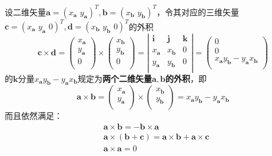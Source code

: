 \begin{definition}[二维矢量外积]
设二维矢量$\boldsymbol{a}=\left( x_{\boldsymbol{a}}\,\,y_{\boldsymbol{a}} \right) ^T,\boldsymbol{b}=\left( x_{\boldsymbol{b}}\,\,y_{\boldsymbol{b}}  \right) ^T$，令其对应的三维矢量$\boldsymbol{c}=\left( x_{\boldsymbol{a}}\,\,y_{\boldsymbol{a}}\,\,0  \right) ^T,\boldsymbol{d}=\left( x_{\boldsymbol{b}}\,\,y_{\boldsymbol{b}}\,\,0 \right) ^T$的外积
\[
\boldsymbol{c}\times \boldsymbol{d}=\left( \begin{array}{c}
	x_{\boldsymbol{a}}\\
	y_{\boldsymbol{a}}\\
	0\\
\end{array} \right) \times \left( \begin{array}{c}
	x_{\boldsymbol{b}}\\
	y_{\boldsymbol{b}}\\
	0\\
\end{array} \right) =\left| \begin{matrix}
	\mathbf{i}&		\mathbf{j}&		\mathbf{k}\\
	x_{\boldsymbol{a}}&		x_{\boldsymbol{b}}&		0\\
	y_{\boldsymbol{a}}&		y_{\boldsymbol{b}}&		0\\
\end{matrix} \right|=\left( \begin{array}{c}
	0\\
	0\\
	x_{\boldsymbol{a}}y_{\boldsymbol{b}}-y_{\boldsymbol{a}}x_{\boldsymbol{b}}\\
\end{array} \right)
\]
的$\mathbf{k}$分量$x_{\boldsymbol{a}}y_{\boldsymbol{b}}-y_{\boldsymbol{a}}x_{\boldsymbol{b}}$规定为{\bf 两个二维矢量$\boldsymbol{a},\boldsymbol{b}$的外积}，即
\[
\boldsymbol{a}\times \boldsymbol{b}=\left( \begin{array}{c}
	x_{\boldsymbol{a}}\\
	y_{\boldsymbol{a}}\\
\end{array} \right) \times \left( \begin{array}{c}
	x_{\boldsymbol{b}}\\
	y_{\boldsymbol{b}}\\
\end{array} \right) =x_{\boldsymbol{a}}y_{\boldsymbol{b}}-y_{\boldsymbol{a}}x_{\boldsymbol{b}}
\]
而且依然满足：
\begin{align*}
&\boldsymbol{a}\times \boldsymbol{b}=-\boldsymbol{b}\times \boldsymbol{a} \\
&\boldsymbol{a}\times \left( \boldsymbol{b}+\boldsymbol{c} \right) =\boldsymbol{a}\times \boldsymbol{b}+\boldsymbol{a}\times \boldsymbol{c} \\
&\boldsymbol{a}\times \boldsymbol{a}=0
\end{align*}
\end{definition}

